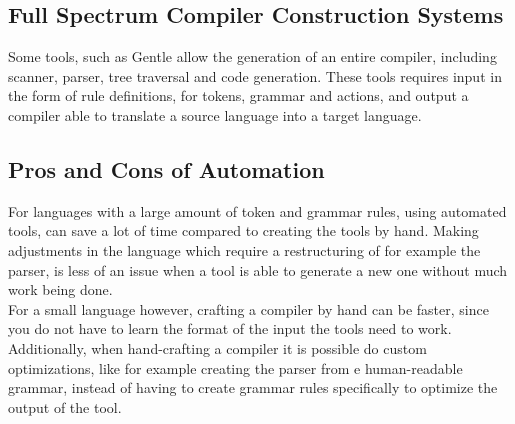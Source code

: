   \subsection{Full Spectrum Compiler Construction Systems}
  
    Some tools, such as Gentle \cite{gentlehome} allow the generation of an entire compiler, including
    scanner, parser, tree traversal and code generation. These tools requires input in the form of
    rule definitions, for tokens, grammar and actions, and output a compiler able to translate a source
    language into a target language.
    
  \subsection{Pros and Cons of Automation}

	For languages with a large amount of token and grammar rules, using automated tools, can save
	a lot of time compared to creating the tools by hand. Making adjustments in the language which
	require a restructuring of for example the parser, is less of an issue when a tool is able to
	generate a new one without much work being done.
	\\
	For a small language however, crafting a compiler by hand can be faster, since you do not have
	to learn the format of the input the tools need to work. Additionally, when hand-crafting a compiler
	it is possible do custom optimizations, like for example creating the parser from e human-readable
	grammar, instead of having to create grammar rules specifically to optimize the output of the tool.
	
    
